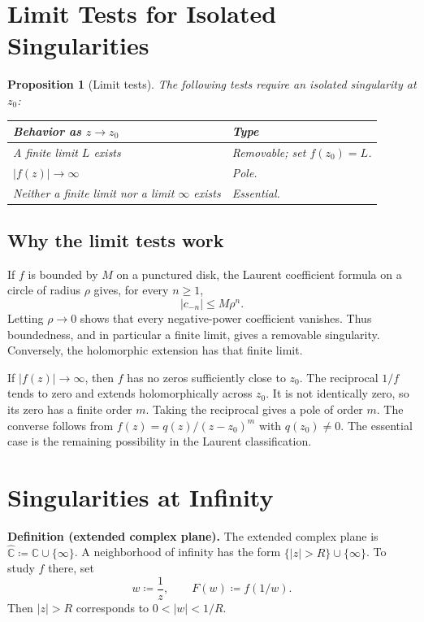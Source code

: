 \documentclass[11pt,a4paper]{article}
\theoremstyle{definition}
\theoremstyle{plain}
\newtheorem{proposition}{Proposition}
\newcommand{\C}{\mathbb{C}}
\begin{document}
\section{Limit Tests for Isolated Singularities}
\begin{proposition}[Limit tests]
The following tests require an \emph{isolated} singularity at $z_0$:
\begin{center}
\begin{tabular}{@{}p{.51\linewidth}p{.39\linewidth}@{}}
\toprule
Behavior as $z\to z_0$ & Type\\ \midrule
A finite limit $L$ exists & Removable; set $f(z_0)=L$.\\[3pt]
$\lvert f(z)\rvert\to\infty$ & Pole.\\[3pt]
Neither a finite limit nor a limit $\infty$ exists & Essential.\\
\bottomrule
\end{tabular}
\end{center}
\end{proposition}


\subsection{Why the limit tests work}
If $f$ is bounded by $M$ on a punctured disk, the Laurent coefficient
formula on a circle of radius $\rho$ gives, for every $n\geq1$,
\begin{equation}\label{eq:29}
|c_{-n}|\leq M\rho^n.
\end{equation}
Letting $\rho\to0$ shows that every negative-power coefficient vanishes.
Thus boundedness, and in particular a finite limit, gives a removable
singularity. Conversely, the holomorphic extension has that finite limit.

If $|f(z)|\to\infty$, then $f$ has no zeros sufficiently close to $z_0$.
The reciprocal $1/f$ tends to zero and extends holomorphically across
$z_0$. It is not identically zero, so its zero has a finite order $m$.
Taking the reciprocal gives a pole of order $m$. The converse follows
from $f(z)=q(z)/(z-z_0)^m$ with $q(z_0)\neq0$.
The essential case is the remaining possibility in the Laurent
classification.

\section{Singularities at Infinity}
\textbf{Definition (extended complex plane).} The extended complex plane is $\widehat{\C}\coloneqq \C\cup\{\infty\}$.
A neighborhood of infinity has the form
$\{|z|>R\}\cup\{\infty\}$. To study $f$ there, set
\begin{equation}\label{eq:30}
w\coloneqq\frac1z,\qquad F(w)\coloneqq f(1/w).
\end{equation}
Then $|z|>R$ corresponds to $0<|w|<1/R$.
\end{document}
